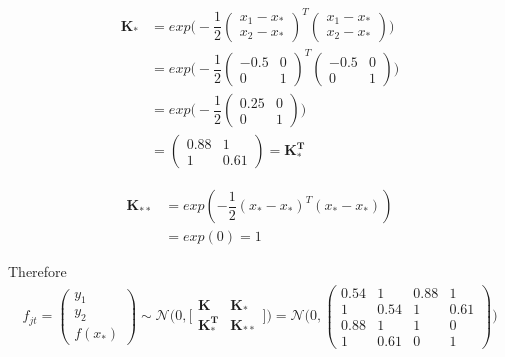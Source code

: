 \documentclass[11pt]{article}
\begin{document}
\begin{align*}
	\boldsymbol{K_*} &= exp\big(-\dfrac{1}{2}
	\begin{pmatrix}
		x_1 - x_* \\
		x_2 - x_*
	\end{pmatrix}^T 
	\begin{pmatrix}
		x_1 - x_* \\
		x_2 - x_*
	\end{pmatrix}
	\big)\\	
	&= exp\big(-\dfrac{1}{2}
	\begin{pmatrix}
		-0.5 & 0\\
		0 & 1
	\end{pmatrix}^T 
	\begin{pmatrix}
		-0.5 & 0\\
		0 & 1
	\end{pmatrix}
	\big)\\	
	&= exp\big(-\dfrac{1}{2}
	\begin{pmatrix}
		0.25 & 0 \\
		0 & 1
	\end{pmatrix}
	\big)\\	
	&=
	\begin{pmatrix}
		0.88 & 1 \\
		1 & 0.61
	\end{pmatrix} = \boldsymbol{K^T_*}
\end{align*}

\begin{align*}
	\boldsymbol{K_{**}} &= exp(-\dfrac{1}{2} (x_* - x_*)^T (x_* - x_*)) \\
		   &= exp(0) = 1
\end{align*}

Therefore
\begin{align*}
	f_{jt} =
	\begin{pmatrix}
		y_1\\
		y_2\\
		f(x_*)
	\end{pmatrix}
	\sim \mathcal N \Big(0, \Big[
	\begin{matrix}
		\boldsymbol{K} & \boldsymbol{K_*} \\
		\boldsymbol{K_*^T} & \boldsymbol{K_{**}}
	\end{matrix}
	\Big]\Big)
	= \mathcal N \Big(0,
	\begin{pmatrix}
		0.54 & 1 & 0.88 & 1\\
		1 & 0.54 & 1 & 0.61\\		
		0.88 & 1 & 1 & 0\\
		1 & 0.61 & 0 & 1
	\end{pmatrix}
	\Big)
\end{align*}
\end{document}
